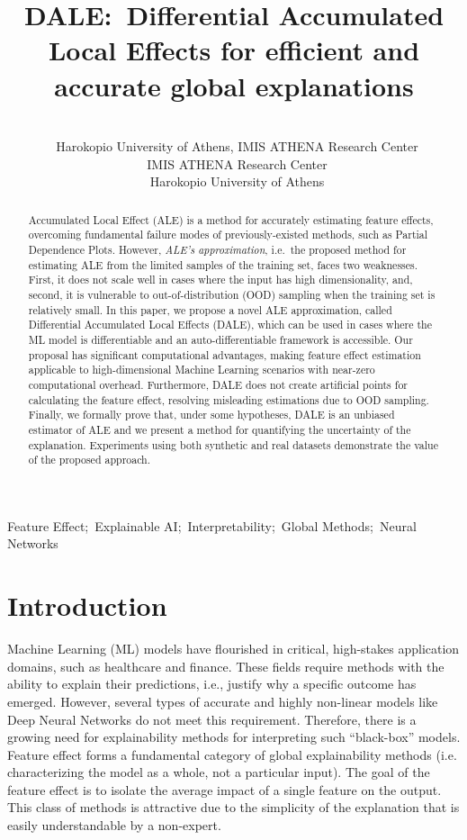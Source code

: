 \documentclass[wcp]{jmlr}
\title[DALE:~Differential Accumulated Local Effects]{DALE:~Differential Accumulated Local Effects for efficient and accurate global explanations}
\author{\Name{Vasilis Gkolemis} \Email{gkolemis@hua.gr, vgkolemis@athenarc.gr}\\
  \addr~Harokopio University of Athens, IMIS ATHENA Research Center
  \AND
  \Name{Theodore Dalamagas} \Email{dalamag@athenarc.gr}\\
  \addr~IMIS ATHENA Research Center
  \AND
  \Name{Christos Diou} \Email{diou@hua.gr}\\
  \addr~Harokopio University of Athens
}
\begin{document}
\maketitle

\begin{abstract}
Accumulated Local Effect (ALE) is a method for accurately estimating feature effects, overcoming fundamental failure modes of previously-existed methods, such as Partial Dependence Plots. However, \textit{ALE's approximation}, i.e.~the proposed method for estimating ALE from the limited samples of the training set, faces two weaknesses. First, it does not scale well in cases where the input has high dimensionality, and, second, it is vulnerable to out-of-distribution (OOD) sampling when the training set is relatively small. In this paper, we propose a novel ALE approximation, called Differential Accumulated Local Effects (DALE), which can be used in cases where the ML model is differentiable and an auto-differentiable framework is accessible. Our proposal has significant computational advantages, making feature effect estimation applicable to high-dimensional Machine Learning scenarios with near-zero computational overhead. Furthermore, DALE does not create artificial points for calculating the feature effect, resolving misleading estimations due to OOD sampling. Finally, we formally prove that, under some hypotheses, DALE is an unbiased estimator of ALE and we present a method for quantifying the uncertainty of the explanation. Experiments using both synthetic and real datasets demonstrate the value of the proposed approach.
\end{abstract}
\begin{keywords}
Feature Effect;~Explainable AI;~Interpretability;~Global Methods;~Neural Networks
\end{keywords}

\section{Introduction}
\label{sec:1-introduction}

Machine Learning (ML) models have flourished in critical, high-stakes application domains, such as healthcare and finance. These fields require methods with the ability to explain their predictions, i.e., justify why a specific outcome has emerged. However, several types of accurate and highly non-linear models like Deep Neural Networks do not meet this requirement. Therefore, there is a growing need for explainability methods for interpreting such ``black-box'' models. Feature effect forms a fundamental category of global explainability methods (i.e. characterizing the model as a whole, not a particular input). The goal of the feature effect is to isolate the average impact of a single feature on the output. This class of methods is attractive due to the simplicity of the explanation that is easily understandable by a non-expert.
\end{document}
